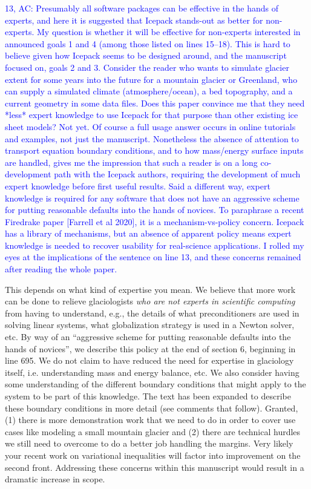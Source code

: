 \documentclass{article}
\theoremstyle{definition}
\theoremstyle{plain}
\begin{document}
\textcolor{blue}{13, AC:  Presumably all software packages can be effective in the hands of experts, and here it is suggested that Icepack stands-out as better for non-experts.  My question is whether it will be effective for non-experts interested in announced goals 1 and 4 (among those listed on lines 15--18).  This is hard to believe given how Icepack seems to be designed around, and the manuscript focused on, goals 2 and 3.  Consider the reader who wants to simulate glacier extent for some years into the future for a mountain glacier or Greenland, who can supply a simulated climate (atmosphere/ocean), a bed topography, and a current geometry in some data files.  Does this paper convince me that they need *less* expert knowledge to use Icepack for that purpose than other existing ice sheet models?  Not yet.  Of course a full usage answer occurs in online tutorials and examples, not just the manuscript.  Nonetheless the absence of attention to transport equation boundary conditions, and to how mass/energy surface inputs are handled, gives me the impression that such a reader is on a long co-development path with the Icepack authors, requiring the development of much expert knowledge before first useful results.  Said a different way, expert knowledge is required for any software that does not have an aggressive scheme for putting reasonable defaults into the hands of novices.  To paraphrase a recent Firedrake paper [Farrell et al 2020], it is a mechanism-vs-policy concern.  Icepack has a library of mechanisms, but an absence of apparent policy means expert knowledge is needed to recover usability for real-science applications.  I rolled my eyes at the implications of the sentence on line 13, and these concerns remained after reading the whole paper.}

This depends on what kind of expertise you mean.
We believe that more work can be done to relieve glaciologists \emph{who are not experts in scientific computing} from having to understand, e.g., the details of what preconditioners are used in solving linear systems, what globalization strategy is used in a Newton solver, etc.
By way of an ``aggressive scheme for putting reasonable defaults into the hands of novices'', we describe this policy at the end of section 6, beginning in line 695.
We do not claim to have reduced the need for expertise in glaciology itself, i.e. understanding mass and energy balance, etc.
We also consider having some understanding of the different boundary conditions that might apply to the system to be part of this knowledge.
The text has been expanded to describe these boundary conditions in more detail (see comments that follow).
Granted, (1) there is more demonstration work that we need to do in order to cover use cases like modeling a small mountain glacier and (2) there are technical hurdles we still need to overcome to do a better job handling the margins.
Very likely your recent work on variational inequalities will factor into improvement on the second front.
Addressing these concerns within this manuscript would result in a dramatic increase in scope.
\end{document}
